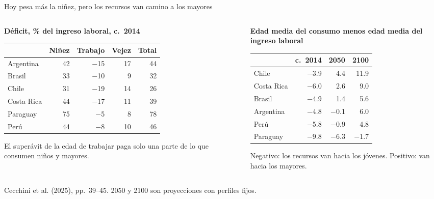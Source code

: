 \documentclass[aspectratio=169,11pt]{beamer}
\newcommand{\fuente}[1]{\par\vfill{\small\color{cGris}#1\par}}
\begin{document}
\begin{frame}{Hoy pesa más la niñez, pero los recursos van camino a los mayores}
  \begin{columns}[T]
    \begin{column}{0.50\textwidth}
      \textbf{Déficit, \% del ingreso laboral, c.\ 2014}\par\smallskip
      \setlength{\tabcolsep}{4pt}
      \begin{tabular}{@{}lrrrr@{}}
        \toprule
        & Niñez & Trabajo & Vejez & Total \\
        \midrule
        Argentina & 42 & $-$15 & 17 & 44 \\
        Brasil & 33 & $-$10 & 9 & 32 \\
        Chile & 31 & $-$19 & 14 & 26 \\
        Costa Rica & 44 & $-$17 & 11 & 39 \\
        Paraguay & 75 & $-$5 & 8 & 78 \\
        Perú & 44 & $-$8 & 10 & 46 \\
        \bottomrule
      \end{tabular}
      \par\medskip
      El superávit de la edad de trabajar paga solo una parte de lo que consumen niños y mayores.
    \end{column}
    \begin{column}{0.47\textwidth}
      \pause
      \textbf{Edad media del consumo menos edad media del ingreso laboral}\par\smallskip
      \begin{tabular}{@{}lrrr@{}}
        \toprule
        & c.\ 2014 & 2050 & 2100 \\
        \midrule
        Chile & $-$3.9 & 4.4 & 11.9 \\
        Costa Rica & $-$6.0 & 2.6 & 9.0 \\
        Brasil & $-$4.9 & 1.4 & 5.6 \\
        Argentina & $-$4.8 & $-$0.1 & 6.0 \\
        Perú & $-$5.8 & $-$0.9 & 4.8 \\
        Paraguay & $-$9.8 & $-$6.3 & $-$1.7 \\
        \bottomrule
      \end{tabular}
      \par\medskip
      Negativo: los recursos van hacia los jóvenes. Positivo: van hacia los mayores.
    \end{column}
  \end{columns}
  \fuente{Cecchini et al. (2025), pp.~39--45. 2050 y 2100 son proyecciones con perfiles fijos.}
\end{frame}
\end{document}
